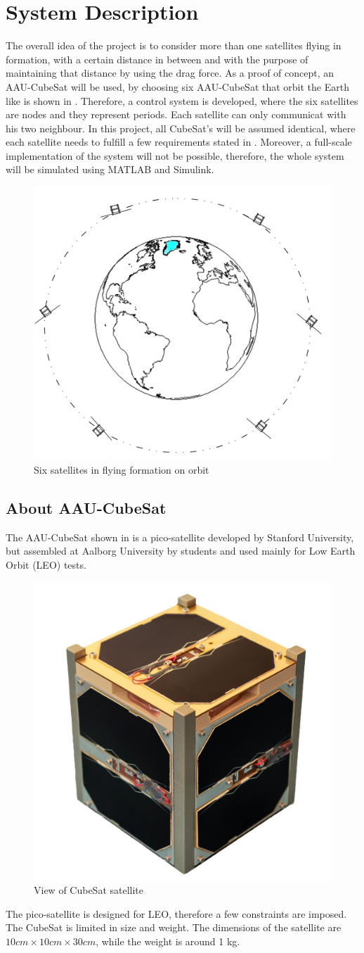 \chapter{System Description}\label{chap:systemDescribtion}
The overall idea of the project is to consider more than one satellites flying in formation, with a certain distance in between and with the purpose of maintaining that distance by using the drag force. As a proof of concept, an AAU-CubeSat will be used, by choosing six AAU-CubeSat that orbit the Earth like is shown in  . Therefore, a control system is developed, where the six satellites are nodes and they represent periods. Each satellite can only communicat with his two neighbour. In this project, all CubeSat's will be assumed identical, where each satellite needs to fulfill a few requirements stated in . Moreover, a full-scale implementation of the system will not be possible, therefore, the whole system will be simulated using MATLAB and Simulink. 
%
\begin{figure}[H]
	\centering
	\includegraphics[width=0.6\linewidth]{figures/earth}
	\caption{Six satellites in flying formation on orbit}
	\label{fig:1}
\end{figure}
%
\section{About AAU-CubeSat}
The AAU-CubeSat shown in  is a pico-satellite developed by Stanford University, but assembled at Aalborg University by students and used mainly for Low Earth Orbit (LEO)  tests.
\begin{figure}[H]
	\centering
	\includegraphics[width=0.3\linewidth]{figures/aau_cubsat}
	\caption{View of CubeSat satellite}
	\label{fig:pico}
\end{figure}
The pico-satellite is designed for LEO, therefore a few constraints are imposed. The CubeSat is limited in size and weight. The dimensions of the satellite are $10cm\times10cm\times30cm$, while the weight is around 1 kg. 

